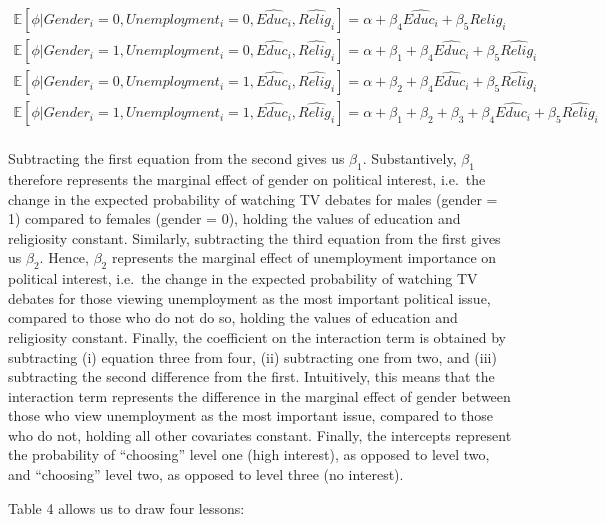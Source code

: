 \documentclass[
]{article}
\begin{document}
\[
\begin{aligned}
\mathbb{E}[\phi \vert Gender_{i} = 0, Unemployment_{i} = 0, \hat{Educ_{i}}, \hat{Relig_{i}}] = \alpha + \beta_{4}\hat{Educ_{i}} + \beta_{5}\hat{Relig_{i}} \\
\mathbb{E}[\phi \vert Gender_{i} = 1, Unemployment_{i} = 0, \hat{Educ_{i}}, \hat{Relig_{i}}] = \alpha + \beta_{1} + \beta_{4}\hat{Educ_{i}} + \beta_{5}\hat{Relig_{i}} \\
\mathbb{E}[\phi \vert Gender_{i} = 0, Unemployment_{i} = 1, \hat{Educ_{i}}, \hat{Relig_{i}}] = \alpha + \beta_{2} + \beta_{4}\hat{Educ_{i}} + \beta_{5}\hat{Relig_{i}} \\
\mathbb{E}[\phi \vert Gender_{i} = 1, Unemployment_{i} = 1, \hat{Educ_{i}}, \hat{Relig_{i}}] = \alpha + \beta_{1} + \beta_{2} + \beta_{3} + \beta_{4}\hat{Educ_{i}} + \beta_{5}\hat{Relig_{i}} \\
\end{aligned}
\]

Subtracting the first equation from the second gives us \(\beta_{1}\).
Substantively, \(\beta_{1}\) therefore represents the marginal effect of
gender on political interest, i.e.~the change in the expected
probability of watching TV debates for males (gender = 1) compared to
females (gender = 0), holding the values of education and religiosity
constant. Similarly, subtracting the third equation from the first gives
us \(\beta_{2}\). Hence, \(\beta_{2}\) represents the marginal effect of
unemployment importance on political interest, i.e.~the change in the
expected probability of watching TV debates for those viewing
unemployment as the most important political issue, compared to those
who do not do so, holding the values of education and religiosity
constant. Finally, the coefficient on the interaction term is obtained
by subtracting (i) equation three from four, (ii) subtracting one from
two, and (iii) subtracting the second difference from the first.
Intuitively, this means that the interaction term represents the
difference in the marginal effect of gender between those who view
unemployment as the most important issue, compared to those who do not,
holding all other covariates constant. Finally, the intercepts represent
the probability of ``choosing'' level one (high interest), as opposed to
level two, and ``choosing'' level two, as opposed to level three (no
interest).

Table 4 allows us to draw four lessons:
\end{document}
